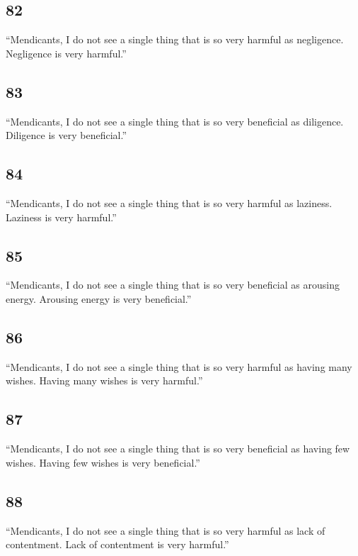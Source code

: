 \documentclass[12pt,openany]{book}%
\begin{document}
\subsection*{82 }

“Mendicants, I do not see a single thing that is so very harmful as negligence. Negligence is very harmful.” 

\subsection*{83 }

“Mendicants, I do not see a single thing that is so very beneficial as diligence. Diligence is very beneficial.” 

\subsection*{84 }

“Mendicants, I do not see a single thing that is so very harmful as laziness. Laziness is very harmful.” 

\subsection*{85 }

“Mendicants, I do not see a single thing that is so very beneficial as arousing energy. Arousing energy is very beneficial.” 

\subsection*{86 }

“Mendicants, I do not see a single thing that is so very harmful as having many wishes. Having many wishes is very harmful.” 

\subsection*{87 }

“Mendicants, I do not see a single thing that is so very beneficial as having few wishes. Having few wishes is very beneficial.” 

\subsection*{88 }

“Mendicants, I do not see a single thing that is so very harmful as lack of contentment. Lack of contentment is very harmful.” 
\end{document}
